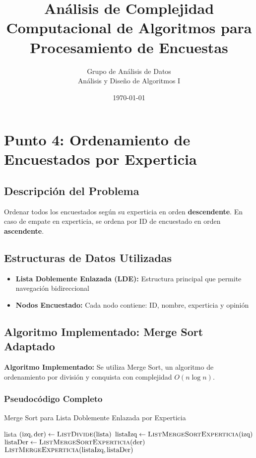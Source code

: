 \documentclass[11pt,a4paper]{article}
\title{\textbf{Análisis de Complejidad Computacional de Algoritmos para Procesamiento de Encuestas}}
\author{Grupo de Análisis de Datos\\
Análisis y Diseño de Algoritmos I}
\date{\today}
\begin{document}
\maketitle

\section{Punto 4: Ordenamiento de Encuestados por Experticia}

\subsection{Descripción del Problema}
Ordenar todos los encuestados según su experticia en orden \textbf{descendente}. En caso de empate en experticia, se ordena por ID de encuestado en orden \textbf{ascendente}.

\subsection{Estructuras de Datos Utilizadas}
\begin{itemize}[label=\textbullet]
\item \textbf{Lista Doblemente Enlazada (LDE):} Estructura principal que permite navegación bidireccional
\item \textbf{Nodos Encuestado:} Cada nodo contiene: ID, nombre, experticia y opinión
\end{itemize}

\subsection{Algoritmo Implementado: Merge Sort Adaptado}

\textbf{Algoritmo Implementado:} Se utiliza Merge Sort, un algoritmo de ordenamiento por división y conquista con complejidad $O(n \log n)$.

\subsubsection{Pseudocódigo Completo}

\begin{algorithm}[H]
\caption{Merge Sort para Lista Doblemente Enlazada por Experticia}
\begin{algorithmic}[1]
        \State \Return lista 
    \EndIf
    \State $(\text{izq}, \text{der}) \leftarrow \textsc{ListDivide}(\text{lista})$ 
    \State $\text{listaIzq} \leftarrow \textsc{ListMergeSortExperticia}(\text{izq})$ 
    \State $\text{listaDer} \leftarrow \textsc{ListMergeSortExperticia}(\text{der})$ 
    \State \Return $\textsc{ListMergeExperticia}(\text{listaIzq}, \text{listaDer})$ 
\EndProcedure
\end{algorithmic}
\end{algorithm}
\end{document}
